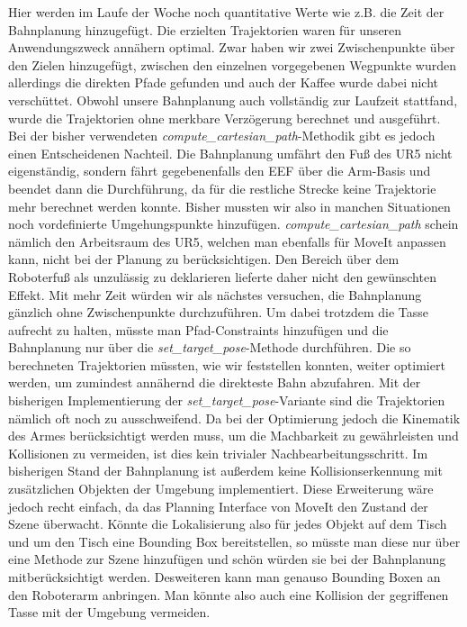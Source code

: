 Hier werden im Laufe der Woche noch quantitative Werte wie z.B. die Zeit der Bahnplanung hinzugefügt.
\newline
Die erzielten Trajektorien waren für unseren Anwendungszweck annähern optimal. Zwar haben wir zwei Zwischenpunkte über den Zielen hinzugefügt, zwischen den einzelnen vorgegebenen Wegpunkte wurden allerdings die direkten Pfade gefunden und auch der Kaffee wurde dabei nicht verschüttet.
\newline
Obwohl unsere Bahnplanung auch vollständig zur Laufzeit stattfand, wurde die Trajektorien ohne merkbare Verzögerung berechnet und ausgeführt.
\newline
Bei der bisher verwendeten \textit{compute\_cartesian\_path}-Methodik gibt es jedoch einen Entscheidenen Nachteil. Die Bahnplanung umfährt den Fuß des UR5 nicht eigenständig, sondern fährt gegebenenfalls den EEF über die Arm-Basis und beendet dann die Durchführung, da für die restliche Strecke keine Trajektorie mehr berechnet werden konnte. Bisher mussten wir also in manchen Situationen noch vordefinierte Umgehungspunkte hinzufügen. \textit{compute\_cartesian\_path} schein nämlich den Arbeitsraum des UR5, welchen man ebenfalls für MoveIt anpassen kann, nicht bei der Planung zu berücksichtigen. Den Bereich über dem Roboterfuß als unzulässig zu deklarieren lieferte daher nicht den gewünschten Effekt.
\newline
Mit mehr Zeit würden wir als nächstes versuchen, die Bahnplanung gänzlich ohne Zwischenpunkte durchzuführen. Um dabei trotzdem die Tasse aufrecht zu halten, müsste man Pfad-Constraints hinzufügen und die Bahnplanung nur über die \textit{set\_target\_pose}-Methode durchführen.
\newline
Die so berechneten Trajektorien müssten, wie wir feststellen konnten, weiter optimiert werden, um zumindest annähernd die direkteste Bahn abzufahren. Mit der bisherigen Implementierung der \textit{set\_target\_pose}-Variante sind die Trajektorien nämlich oft noch zu ausschweifend. Da bei der Optimierung jedoch die Kinematik des Armes berücksichtigt werden muss, um die Machbarkeit zu gewährleisten und Kollisionen zu vermeiden, ist dies kein trivialer Nachbearbeitungsschritt.
\newline
Im bisherigen Stand der Bahnplanung ist außerdem keine Kollisionserkennung mit zusätzlichen Objekten der Umgebung implementiert. Diese Erweiterung wäre jedoch recht einfach, da das Planning Interface von MoveIt den Zustand der Szene überwacht. Könnte die Lokalisierung also für jedes Objekt auf dem Tisch und um den Tisch eine Bounding Box bereitstellen, so müsste man diese nur über eine Methode zur Szene hinzufügen und schön würden sie bei der Bahnplanung mitberücksichtigt werden. Desweiteren kann man genauso Bounding Boxen an den Roboterarm anbringen. Man könnte also auch eine Kollision der gegriffenen Tasse mit der Umgebung vermeiden.